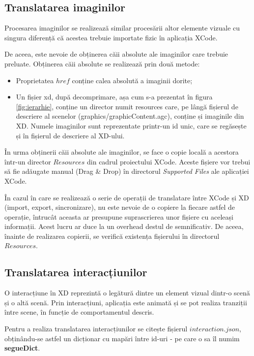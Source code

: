 \subsection{Translatarea imaginilor}

Procesarea imaginilor se realizează similar procesării altor elemente vizuale cu singura diferență că acestea trebuie importate fizic în aplicația XCode.

De aceea, este nevoie de obținerea căii absolute ale imaginilor care trebuie preluate. 
Obținerea căii absolute se realizează prin două metode:

\begin{itemize}  
\item Proprietatea $href$ conține calea absolută a imaginii dorite;
\item Un fișier xd, după decomprimare, așa cum s-a prezentat în figura \ref{fig:ierarhie}, conține un director numit resources care, pe lângă fișierul de descriere al scenelor (graphics/graphicContent.agc), conține și imaginile din XD. Numele imaginilor sunt reprezentate printr-un id unic, care se regăsește și în fișierul de descriere al XD-ului.
\end{itemize}

În urma obținerii căii absolute ale imaginilor, se face o copie locală a acestora într-un director $Resources$ din cadrul proiectului XCode. Aceste fișiere vor trebui să fie adăugate manual (Drag \& Drop) în directorul \textit{Supported Files} ale aplicației XCode.

În cazul în care se realizează o serie de operații de translatare între XCode și XD (import, export, sincronizare), nu este nevoie de o copiere la fiecare astfel de operație, întrucât aceasta ar presupune suprascrierea unor fișiere cu aceleași informații. Acest lucru ar duce la un overhead destul de semnificativ. De aceea, înainte de realizarea copierii, se verifică existența fișierului în directorul $Resources$.

\subsection{Translatarea interacțiunilor}

O interacțiune în XD reprezintă o legătură dintre un element vizual dintr-o scenă și o altă scenă. Prin interacțiuni, aplicația este animată și se pot realiza tranziții între scene, în funcție de comportamentul descris. 

Pentru a realiza translatarea interacțiunilor se citește fișierul $interaction.json$, obținându-se astfel un dicționar cu mapări între id-uri - pe care o sa îl numim \textbf{segueDict}. 

